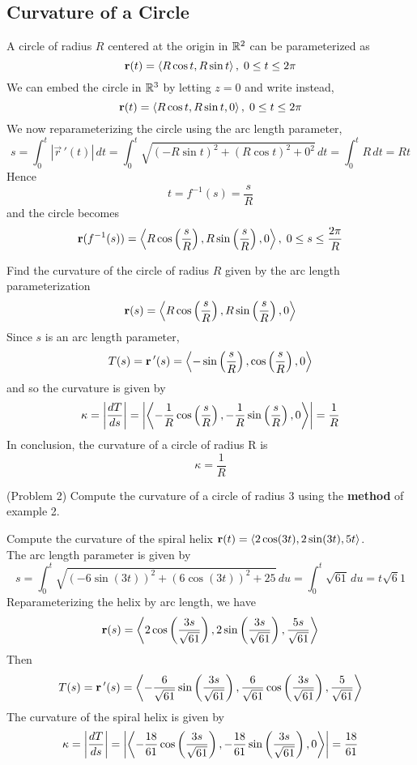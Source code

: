 \documentclass[handout]{ximera}
\begin{document}
\subsection{Curvature of a Circle}
A circle of radius $R$ centered at the origin in $\mathbb R^2$ can be parameterized as
\[
\mathbf r(t) = \left\langle R\cos t, R\sin t\right\rangle, \; 0\leq t \leq 2\pi
\]
We can embed the circle in $\mathbb R^3$ by letting $z = 0$ and write instead,
\[
\mathbf r(t) = \left\langle R\cos t, R\sin t, 0\right\rangle, \; 0\leq t \leq 2\pi
\]
We now reparameterizing the circle using the arc length parameter,
\[
s = \int_0^t |\vec r\,'(t)| \, dt = \int_0^t \sqrt{ (-R\sin t)^2 + (R\cos t)^2 + 0^2} \, dt = \int_0^t R \, dt = Rt
\]
Hence 
\[
t = f^{-1}(s) = \frac{s}{R}
\]
and the circle becomes
\[
\mathbf r(f^{-1}(s)) = \left\langle R \cos\left(\frac{s}{R}\right), R \sin\left(\frac{s}{R}\right), 0\right\rangle, \; 0 \leq s \leq \frac{2\pi}{R}
\]
\begin{example}[Example 2]
Find the curvature of the circle of radius $R$ given by the arc length parameterization
\[
\mathbf r(s) = \left\langle R \cos\left(\frac{s}{R}\right), R \sin\left(\frac{s}{R}\right), 0\right\rangle
\]
Since $s$ is an arc length parameter, 
\[
T(s) = \mathbf r\,'(s) = \left\langle -\sin\left(\frac{s}{R}\right), \cos\left(\frac{s}{R}\right), 0\right\rangle
\]
and so the curvature is given by
\[
\kappa = \left|\frac{dT}{ds}\right| = \left|\left\langle -\frac{1}{R}\cos\left(\frac{s}{R}\right), -\frac{1}{R}\sin\left(\frac{s}{R}\right), 0\right\rangle\right| = \frac{1}{R}
\]
In conclusion, the curvature of a circle of radius R is 
\[
\kappa = \frac{1}{R}
\]
\end{example}

\begin{problem}(Problem 2)
Compute the curvature of a circle of radius 3 using the \textbf{method} of example 2.
\end{problem}

\begin{example}[Example 3]
Compute the curvature of the spiral helix $\mathbf r(t) = \left\langle 2\cos(3t), 2 \sin(3t), 5t\right\rangle$.\\
The arc length parameter is given by
\[
s = \int_0^t \sqrt{\left(-6\sin(3t) \right)^2+\left(6\cos(3t) \right)^2 + 25} \, du = \int_0^t \sqrt{61} \, du = t\sqrt 61
\]
Reparameterizing the helix by arc length, we have
\[
\mathbf r(s) = \left\langle 2\cos\left(\frac{3s}{\sqrt{61}}\right), 2 \sin\left(\frac{3s}{\sqrt{61}}\right), \frac{5s}{\sqrt{61}}\right\rangle
\]
Then
\[
T(s) = \mathbf r\,'(s) = \left\langle -\frac{6}{\sqrt{61}}\sin\left(\frac{3s}{\sqrt{61}}\right), \frac{6}{\sqrt{61}}\cos\left(\frac{3s}{\sqrt{61}}\right), \frac{5}{\sqrt{61}}\right\rangle
\]
The curvature of the spiral helix is given by
\[
\kappa = \left| \frac{dT}{ds} \right| = \left|\left\langle -\frac{18}{61}\cos\left(\frac{3s}{\sqrt{61}}\right), -\frac{18}{61}\sin\left(\frac{3s}{\sqrt{61}}\right), 0\right\rangle\right| = \frac{18}{61}
\]
\end{example}
\end{document}
